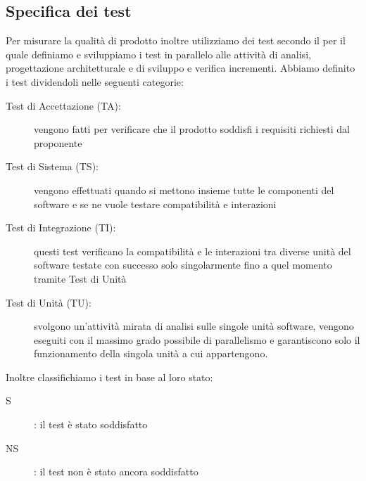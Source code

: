 \documentclass[../piano-di-qualifica.tex]{subfiles}
\begin{document}

\subsection{Specifica dei test}%
\label{sub:test}
    Per misurare la qualità di prodotto inoltre utilizziamo dei test secondo il  per il quale definiamo e sviluppiamo i test in parallelo alle attività di analisi, progettazione architetturale e di sviluppo e verifica incrementi.
    Abbiamo definito i test dividendoli nelle seguenti categorie:
    \begin{description}
      \item [Test di Accettazione (TA):] vengono fatti per verificare che il prodotto soddisfi i requisiti richiesti dal proponente
      \item [Test di Sistema (TS):] vengono effettuati quando si mettono insieme tutte le componenti del software e se ne vuole testare compatibilità e interazioni
      \item [Test di Integrazione (TI):] questi test verificano la compatibilità e le interazioni tra diverse unità del software testate con successo solo singolarmente fino a quel momento tramite Test di Unità
      \item [Test di Unità (TU):] svolgono un'attività mirata di analisi sulle singole unità software, vengono eseguiti con il massimo grado possibile di parallelismo e garantiscono solo il funzionamento della singola unità a cui appartengono.
    \end{description}
    Inoltre classifichiamo i test in base al loro stato:
      \begin{description}
        \item [S]: il test è stato soddisfatto
        \item [NS]: il test non è stato ancora soddisfatto
      \end{description}
\end{document}
